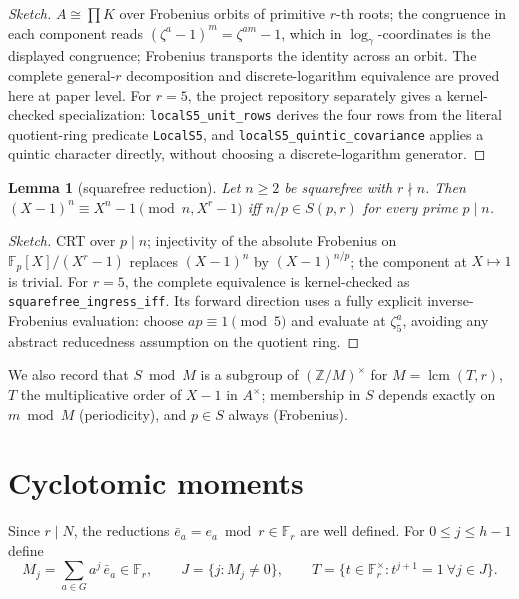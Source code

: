 \documentclass[11pt]{amsart}
\newtheorem{lemma}[theorem]{Lemma}
\theoremstyle{definition}
\theoremstyle{remark}
\newcommand{\F}{\mathbb{F}}
\newcommand{\Z}{\mathbb{Z}}
\newcommand{\lcm}{\operatorname{lcm}}
\begin{document}
\begin{proof}[Sketch]
$A \cong \prod K$ over Frobenius orbits of primitive $r$-th roots;
the congruence in each component reads $(\zeta^a - 1)^m = \zeta^{am}-1$,
which in $\log_\gamma$-coordinates is the displayed congruence; Frobenius
transports the identity across an orbit.  The complete general-$r$
decomposition and discrete-logarithm equivalence are proved here at paper
level.  For $r=5$, the project repository separately gives a kernel-checked
specialization: \texttt{localS5\_unit\_rows} derives the four rows from the
literal quotient-ring predicate \texttt{LocalS5}, and
\texttt{localS5\_quintic\_covariance} applies a quintic character directly,
without choosing a discrete-logarithm generator.
\end{proof}

\begin{lemma}[squarefree reduction]\label{lem:ingress}
Let $n \ge 2$ be squarefree with $r \nmid n$. Then
$(X-1)^n \equiv X^n - 1 \pmod{n, X^r-1}$ iff $n/p \in S(p,r)$ for every
prime $p \mid n$.
\end{lemma}

\begin{proof}[Sketch]
CRT over $p \mid n$; injectivity of the absolute Frobenius on
$\F_p[X]/(X^r-1)$ replaces $(X-1)^n$ by $(X-1)^{n/p}$; the component at
$X \mapsto 1$ is trivial.  For $r=5$, the complete equivalence is
kernel-checked as \texttt{squarefree\_ingress\_iff}.  Its forward direction
uses a fully explicit inverse-Frobenius evaluation: choose
$a p\equiv1\pmod5$ and evaluate at $\zeta_5^a$, avoiding any abstract
reducedness assumption on the quotient ring.
\end{proof}

We also record that $S \bmod M$ is a subgroup of $(\Z/M)^\times$ for
$M = \lcm(T, r)$, $T$ the multiplicative order of $X - 1$ in $A^\times$;
membership in $S$ depends exactly on $m \bmod M$ (periodicity), and
$p \in S$ always (Frobenius).

\section{Cyclotomic moments}\label{sec:moments}

Since $r \mid N$, the reductions $\bar e_a = e_a \bmod r \in \F_r$ are well
defined. For $0 \le j \le h-1$ define
\[
M_j = \sum_{a \in G} a^j\, \bar e_a \in \F_r,
\qquad
J = \{ j : M_j \ne 0 \},
\qquad
T = \{ t \in \F_r^\times : t^{j+1} = 1 \ \forall j \in J \}.
\]
\end{document}
